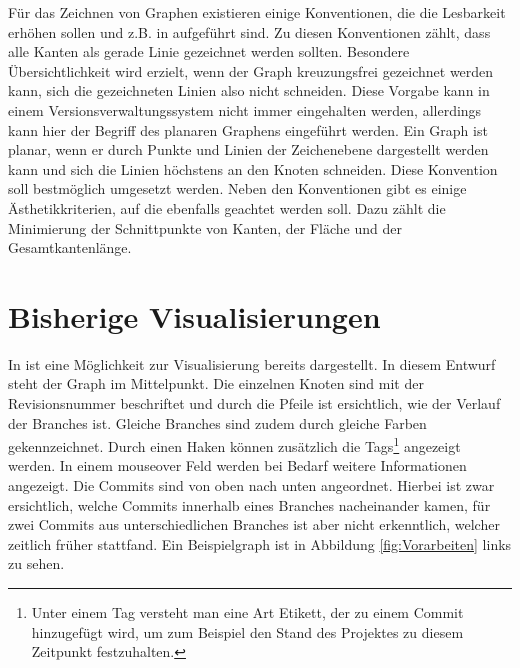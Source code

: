 \documentclass[nocolor]{tudbook}
\begin{document}
Für das Zeichnen von Graphen existieren einige Konventionen, die die Lesbarkeit erhöhen sollen und z.B. in \cite{Aesthetik} aufgeführt sind. Zu diesen Konventionen zählt, dass alle Kanten als gerade Linie gezeichnet werden sollten. Besondere Übersichtlichkeit wird erzielt, wenn der Graph kreuzungsfrei gezeichnet werden kann, sich die gezeichneten Linien also nicht schneiden. Diese Vorgabe kann in einem Versionsverwaltungssystem nicht immer eingehalten werden, allerdings kann hier der Begriff des planaren Graphens eingeführt werden. Ein Graph ist planar, wenn er durch Punkte und Linien der Zeichenebene dargestellt werden kann und sich die Linien höchstens an den Knoten schneiden. Diese Konvention soll bestmöglich umgesetzt werden. Neben den Konventionen gibt es einige Ästhetikkriterien, auf die ebenfalls geachtet werden soll. Dazu zählt die Minimierung der Schnittpunkte von Kanten, der Fläche und der Gesamtkantenlänge.

\section{Bisherige Visualisierungen}
\label{sec:alt}
In \cite{Gruppe2.1} ist eine Möglichkeit zur Visualisierung bereits dargestellt. In diesem Entwurf steht der Graph im Mittelpunkt. Die einzelnen Knoten sind mit der Revisionsnummer beschriftet und durch die Pfeile ist ersichtlich, wie der Verlauf der Branches ist. Gleiche Branches sind zudem durch gleiche Farben gekennzeichnet. Durch einen Haken können zusätzlich die Tags\footnote{Unter einem Tag versteht man eine Art Etikett, der zu einem Commit hinzugefügt wird, um zum Beispiel den Stand des Projektes zu diesem Zeitpunkt festzuhalten.} angezeigt werden. In einem mouseover Feld werden bei Bedarf weitere Informationen angezeigt. Die Commits sind von oben nach unten angeordnet. Hierbei ist zwar ersichtlich, welche Commits innerhalb eines Branches nacheinander kamen, für zwei Commits aus unterschiedlichen Branches ist aber nicht erkenntlich, welcher zeitlich früher stattfand. Ein Beispielgraph ist in Abbildung \ref{fig:Vorarbeiten} links zu sehen.
\end{document}

